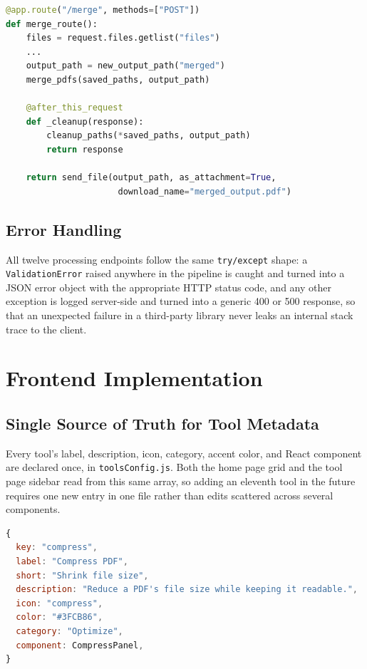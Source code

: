 \documentclass[12pt,a4paper]{report}
\begin{document}
\begin{lstlisting}[language=Python, caption={Per-request cleanup hook, from \texttt{app.py}}, label=lst:route]
@app.route("/merge", methods=["POST"])
def merge_route():
    files = request.files.getlist("files")
    ...
    output_path = new_output_path("merged")
    merge_pdfs(saved_paths, output_path)

    @after_this_request
    def _cleanup(response):
        cleanup_paths(*saved_paths, output_path)
        return response

    return send_file(output_path, as_attachment=True,
                      download_name="merged_output.pdf")
\end{lstlisting}

\subsection{Error Handling}
All twelve processing endpoints follow the same \texttt{try/except} shape: a
\texttt{ValidationError} raised anywhere in the pipeline is caught and turned into a JSON error
object with the appropriate HTTP status code, and any other exception is logged server-side and
turned into a generic 400 or 500 response, so that an unexpected failure in a third-party library
never leaks an internal stack trace to the client.

\section{Frontend Implementation}

\subsection{Single Source of Truth for Tool Metadata}
Every tool's label, description, icon, category, accent color, and React component are declared
once, in \texttt{toolsConfig.js}. Both the home page grid and the tool page sidebar read from
this same array, so adding an eleventh tool in the future requires one new entry in one file
rather than edits scattered across several components.

\begin{lstlisting}[language=Javascript, caption={One entry from \texttt{toolsConfig.js}}, label=lst:toolsconfig]
{
  key: "compress",
  label: "Compress PDF",
  short: "Shrink file size",
  description: "Reduce a PDF's file size while keeping it readable.",
  icon: "compress",
  color: "#3FCB86",
  category: "Optimize",
  component: CompressPanel,
}
\end{lstlisting}
\end{document}
